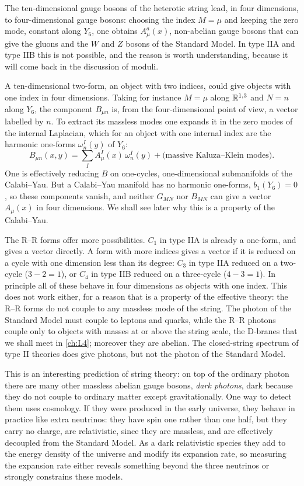 The ten-dimensional gauge bosons of the heterotic string lead, in four dimensions, to four-dimensional gauge bosons: choosing the index $M=\mu$ and keeping the zero mode, constant along $Y_6$, one obtains $A^a_\mu(x)$, non-abelian gauge bosons that can give the gluons and the $W$ and $Z$ bosons of the Standard Model. In type IIA and type IIB this is not possible, and the reason is worth understanding, because it will come back in the discussion of moduli.

A ten-dimensional two-form, an object with two indices, could give objects with one index in four dimensions. Taking for instance $M=\mu$ along $\mathbb{R}^{1,3}$ and $N=n$ along $Y_6$, the component $B_{\mu n}$ is, from the four-dimensional point of view, a vector labelled by $n$. To extract its massless modes one expands it in the zero modes of the internal Laplacian, which for an object with one internal index are the harmonic one-forms $\omega^I_n(y)$ of $Y_6$:
\begin{equation}
  B_{\mu n}(x,y) = \sum_I A^I_\mu(x)\,\omega^I_n(y) + \text{(massive Kaluza--Klein modes)} .
  \label{eq:L2-Bmu}
\end{equation}
One is effectively reducing $B$ on one-cycles, one-dimensional submanifolds of the Calabi--Yau. But a Calabi--Yau manifold has no harmonic one-forms, $b_1(Y_6) = 0$, so these components vanish, and neither $G_{MN}$ nor $B_{MN}$ can give a vector $A_\mu(x)$ in four dimensions. We shall see later why this is a property of the Calabi--Yau.

The R--R forms offer more possibilities. $C_1$ in type IIA is already a one-form, and gives a vector directly. A form with more indices gives a vector if it is reduced on a cycle with one dimension less than its degree: $C_3$ in type IIA reduced on a two-cycle ($3-2 = 1$), or $C_4$ in type IIB reduced on a three-cycle ($4-3=1$). In principle all of these behave in four dimensions as objects with one index.
This does not work either, for a reason that is a property of the effective theory: the R--R forms do not couple to any massless mode of the string. The photon of the Standard Model must couple to leptons and quarks, while the R--R photons couple only to objects with masses at or above the string scale, the D-branes that we shall meet in \cref{ch:L4}; moreover they are abelian. The closed-string spectrum of type II theories does give photons, but not the photon of the Standard Model.

This is an interesting prediction of string theory: on top of the ordinary photon there are many other massless abelian gauge bosons, \emph{dark photons}, dark because they do not couple to ordinary matter except gravitationally. One way to detect them uses cosmology. If they were produced in the early universe, they behave in practice like extra neutrinos: they have spin one rather than one half, but they carry no charge, are relativistic, since they are massless, and are effectively decoupled from the Standard Model. As a dark relativistic species they add to the energy density of the universe and modify its expansion rate, so measuring the expansion rate either reveals something beyond the three neutrinos or strongly constrains these models.


